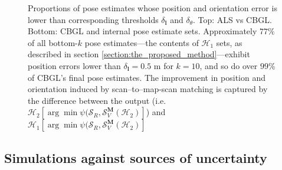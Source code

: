\begin{figure}
  \vspace{-0.3cm}
  
  \vspace{0.01cm}
  \caption{\small Proportions of pose estimates whose position and orientation
           error is lower than corresponding thresholds $\delta_{\bm{l}}$ and
           $\delta_{\theta}$. Top: ALS vs CBGL. Bottom: CBGL and internal pose
           estimate sets.  Approximately $77\%$ of all bottom-$k$ pose
           estimates---the contents of $\mathcal{H}_1$ sets,
           as described in section \ref{section:the_proposed_method}---exhibit
           position errors lower than $\delta_{\bm{l}} = 0.5$ m for $k=10$, and
           so do over $99\%$ of CBGL's final pose estimates. The improvement in
           position and orientation induced by scan--to--map-scan matching is
           captured by the difference between the output (i.e.
           $\mathcal{H}_2[\arg \min \psi(\mathcal{S}_R, \mathcal{S}_V^{\bm{M}}(\mathcal{H}_2)]$) and
           $\mathcal{H}_1[\arg \min \psi(\mathcal{S}_R, \mathcal{S}_V^{\bm{M}}(\mathcal{H}_2)]$}
  \vspace{-0.7cm}
  \label{fig:a:awesomeness}
\end{figure}


\subsection{Simulations against sources of uncertainty}
\label{subsec:exp_b}

